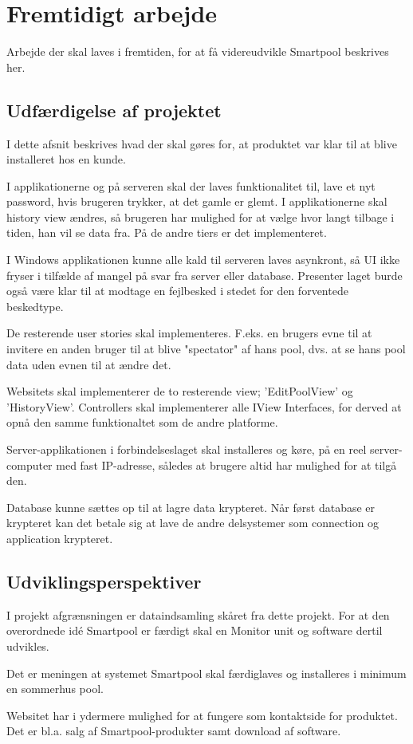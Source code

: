 \chapter{Fremtidigt arbejde}
Arbejde der skal laves i fremtiden, for at få videreudvikle Smartpool beskrives her.
\section{Udfærdigelse af projektet}
I dette afsnit beskrives hvad der skal gøres for, at produktet var klar til at blive installeret hos en kunde.

I applikationerne og på serveren skal der laves funktionalitet til, lave et nyt password, hvis brugeren trykker, at det gamle er glemt.
I applikationerne skal history view ændres, så brugeren har mulighed for at vælge hvor langt tilbage i tiden, han vil se data fra. På de andre tiers er det implementeret.

I Windows applikationen kunne alle kald til serveren laves asynkront, så UI ikke fryser i tilfælde af mangel på svar fra server eller database. Presenter laget burde også være klar til at modtage en fejlbesked i stedet for den forventede beskedtype.

De resterende user stories skal implementeres. F.eks. en brugers evne til at invitere en anden bruger til at blive "spectator" af hans pool, dvs. at se hans pool data uden evnen til at ændre det.

Websitets skal implementerer de to resterende view; 'EditPoolView' og 'HistoryView'. Controllers skal implementerer alle IView Interfaces, for derved at opnå den samme funktionaltet som de andre platforme.   

Server-applikationen i forbindelseslaget skal installeres og køre, på en reel server-computer med fast IP-adresse, således at brugere altid har mulighed for at tilgå den.

Database kunne sættes op til at lagre data krypteret. Når først database er krypteret kan det betale sig at lave de andre delsystemer som connection og application krypteret. 

\section{Udviklingsperspektiver}
I projekt afgrænsningen er dataindsamling skåret fra dette projekt. For at den overordnede idé Smartpool er færdigt skal en Monitor unit og software dertil udvikles.

Det er meningen at systemet Smartpool skal færdiglaves og installeres i minimum en sommerhus pool.

Websitet har i ydermere mulighed for at fungere som kontaktside for produktet. Det er bl.a. salg af Smartpool-produkter samt download af software. 